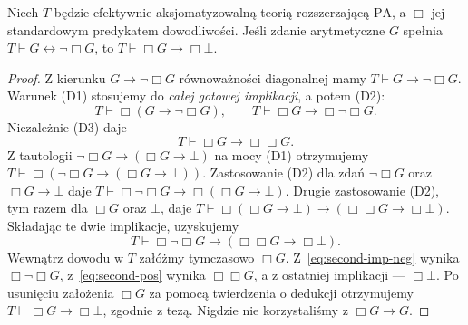 \begin{lemat}
\label{lem:second-box-g}
Niech $T$ będzie efektywnie aksjomatyzowalną teorią
rozszerzającą $\mathrm{PA}$, a $\Box$ jej standardowym
predykatem dowodliwości. Jeśli zdanie arytmetyczne
$G$ spełnia $T\vdash G\leftrightarrow\neg\Box G$,
to $T\vdash\Box G\to\Box\bot$.
\end{lemat}
\begin{proof}
Z kierunku $G\to\neg\Box G$ równoważności diagonalnej
mamy $T\vdash G\to\neg\Box G$.
Warunek (D1) stosujemy do \emph{całej gotowej implikacji},
a potem (D2):
\begin{equation}\label{eq:second-imp-neg}
T\vdash\Box(G\to\neg\Box G),
\qquad T\vdash\Box G\to\Box\neg\Box G.
\end{equation}
Niezależnie (D3) daje
\begin{equation}\label{eq:second-pos}
T\vdash\Box G\to\Box\Box G.
\end{equation}
Z tautologii $\neg\Box G\to(\Box G\to\bot)$
na mocy (D1) otrzymujemy
$T\vdash\Box(\neg\Box G\to(\Box G\to\bot))$.
Zastosowanie (D2) dla zdań $\neg\Box G$ oraz
$\Box G\to\bot$ daje
$T\vdash\Box\neg\Box G\to\Box(\Box G\to\bot)$.
Drugie zastosowanie (D2), tym razem dla
$\Box G$ oraz $\bot$, daje
$T\vdash\Box(\Box G\to\bot)\to
(\Box\Box G\to\Box\bot)$.
Składając te dwie implikacje, uzyskujemy
\[
T\vdash\Box\neg\Box G\to
(\Box\Box G\to\Box\bot).
\]
Wewnątrz dowodu w $T$ załóżmy tymczasowo
$\Box G$. Z~\eqref{eq:second-imp-neg}
wynika $\Box\neg\Box G$,
z~\eqref{eq:second-pos} wynika $\Box\Box G$,
a z ostatniej implikacji --- $\Box\bot$.
Po usunięciu założenia $\Box G$ za pomocą
twierdzenia o dedukcji otrzymujemy
$T\vdash\Box G\to\Box\bot$, zgodnie z tezą.
Nigdzie nie korzystaliśmy z $\Box G\to G$.
\end{proof}

